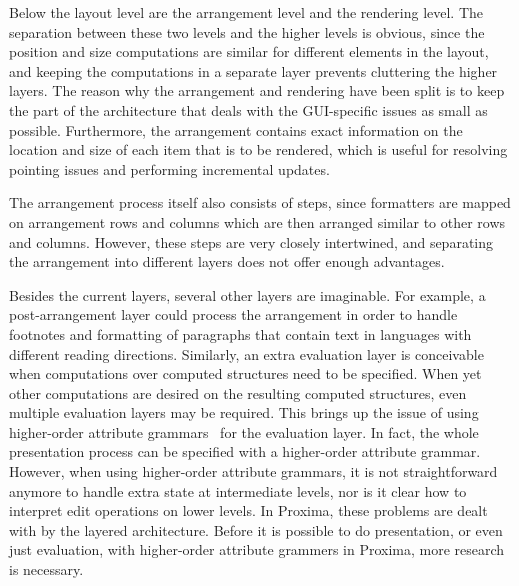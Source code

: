 Below the layout level are the arrangement level and the rendering level. The separation between these two levels and the higher levels is obvious, since the position and size computations are similar for different elements in the layout, and keeping the computations in a separate layer prevents cluttering the higher layers. The reason why the arrangement and rendering have been split is to keep the part of the architecture that deals with the GUI-specific issues as small as possible. Furthermore, the arrangement contains exact information on the location and size of each item that is to be rendered, which is useful for resolving pointing issues and performing incremental updates. 

The arrangement process itself also consists of steps, since formatters are mapped on arrangement rows and columns which are then arranged similar to other rows and columns. However, these steps are very closely intertwined, and separating the arrangement into different layers does not offer enough advantages. 

Besides the current layers, several other layers are imaginable. For example, a post-arrangement layer could process the arrangement in order to handle footnotes and formatting of paragraphs that contain text in languages with different reading directions. Similarly, an extra evaluation layer is conceivable when computations over computed structures need to be specified. When yet other computations are desired on the resulting computed structures, even multiple evaluation layers may be required. This brings up the issue of using higher-order attribute grammars~\cite{Hags} for the evaluation layer. In fact, the whole presentation process can be specified with a higher-order attribute grammar. However, when using higher-order attribute grammars, it is not straightforward anymore to handle extra state at intermediate levels, nor is it clear how to interpret edit operations on lower levels. In Proxima, these problems are dealt with by the layered architecture. Before it is possible to do presentation, or even just evaluation, with higher-order attribute grammers in Proxima, more research is necessary.

